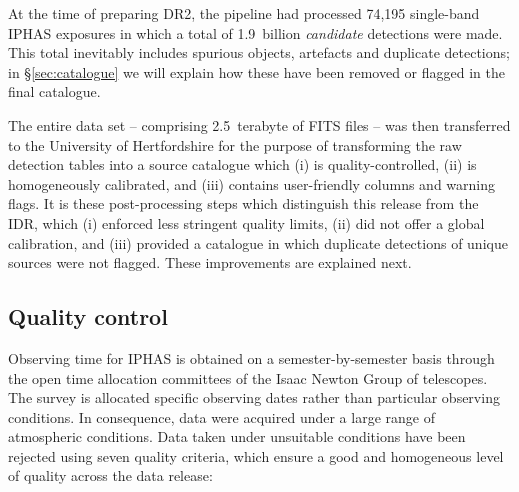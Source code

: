 \documentclass[a4paper,useAMS,usenatbib]{mn2e}
\begin{document}
{At the time of preparing DR2,
the pipeline had processed
74,195 single-band IPHAS exposures 
in which a total of 1.9~billion \emph{candidate} detections
were made.
This total inevitably includes spurious objects, artefacts and
duplicate detections;
in \S\ref{sec:catalogue} we will explain
how these have been removed or flagged in the final catalogue.

The entire data set -- comprising 2.5~terabyte of FITS files --
was then transferred to the University of Hertfordshire
for the purpose of transforming the raw
detection tables into a source catalogue which
(i) is quality-controlled,
(ii) is homogeneously calibrated, and 
(iii) contains user-friendly columns and warning flags.
It is these post-processing steps which distinguish this release
from the IDR, which (i) enforced less stringent quality limits,
(ii) did not offer a global calibration,
and (iii) provided a catalogue in which duplicate detections
of unique sources were not flagged.
These improvements are explained next.}


\subsection{Quality control}
\label{sec:qc}

Observing time for IPHAS is obtained
on a semester-by-semester basis
through the open time allocation committees 
of the Isaac Newton Group of telescopes.
The survey is allocated specific observing dates
rather than particular observing conditions.
In consequence, data were acquired
under a large range of atmospheric conditions.
Data taken under unsuitable conditions
have been rejected using seven quality criteria,
which ensure a good and homogeneous level of quality
across the data release:
\end{document}
